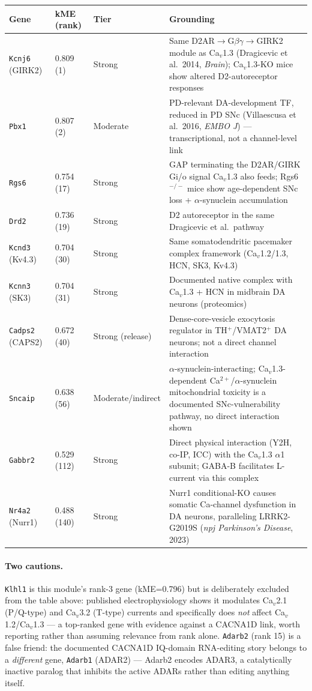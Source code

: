 \documentclass[11pt]{article}
\begin{document}
\begin{table}[h]
\centering
\begin{tabular}{llll}
\toprule
Gene & kME (rank) & Tier & Grounding \\
\midrule
\texttt{Kcnj6} (GIRK2) & 0.809 (1) & Strong & Same D2AR$\to$G$\beta\gamma\to$GIRK2 module as Ca$_v$1.3 (Dragicevic et al.\ 2014, \emph{Brain}); Ca$_v$1.3-KO mice show altered D2-autoreceptor responses \\
\texttt{Pbx1} & 0.807 (2) & Moderate & PD-relevant DA-development TF, reduced in PD SNc (Villaescusa et al.\ 2016, \emph{EMBO J}) --- transcriptional, not a channel-level link \\
\texttt{Rgs6} & 0.754 (17) & Strong & GAP terminating the D2AR/GIRK Gi/o signal Ca$_v$1.3 also feeds; Rgs6$^{-/-}$ mice show age-dependent SNc loss + $\alpha$-synuclein accumulation \\
\texttt{Drd2} & 0.736 (19) & Strong & D2 autoreceptor in the same Dragicevic et al.\ pathway \\
\texttt{Kcnd3} (Kv4.3) & 0.704 (30) & Strong & Same somatodendritic pacemaker complex framework (Ca$_v$1.2/1.3, HCN, SK3, Kv4.3) \\
\texttt{Kcnn3} (SK3) & 0.704 (31) & Strong & Documented native complex with Ca$_v$1.3 + HCN in midbrain DA neurons (proteomics) \\
\texttt{Cadps2} (CAPS2) & 0.672 (40) & Strong (release) & Dense-core-vesicle exocytosis regulator in TH$^+$/VMAT2$^+$ DA neurons; not a direct channel interaction \\
\texttt{Sncaip} & 0.638 (56) & Moderate/indirect & $\alpha$-synuclein-interacting; Ca$_v$1.3-dependent Ca$^{2+}$/$\alpha$-synuclein mitochondrial toxicity is a documented SNc-vulnerability pathway, no direct interaction shown \\
\texttt{Gabbr2} & 0.529 (112) & Strong & Direct physical interaction (Y2H, co-IP, ICC) with the Ca$_v$1.3 $\alpha$1 subunit; GABA-B facilitates L-current via this complex \\
\texttt{Nr4a2} (Nurr1) & 0.488 (140) & Strong & Nurr1 conditional-KO causes somatic Ca-channel dysfunction in DA neurons, paralleling LRRK2-G2019S (\emph{npj Parkinson's Disease}, 2023) \\
\bottomrule
\end{tabular}
\end{table}

\paragraph{Two cautions.} \texttt{Klhl1} is this module's rank-3 gene
(kME=0.796) but is deliberately excluded from the table above: published
electrophysiology shows it modulates Ca$_v$2.1 (P/Q-type) and Ca$_v$3.2
(T-type) currents and specifically does \emph{not} affect Ca$_v$1.2/Ca$_v$1.3
--- a top-ranked gene with evidence against a CACNA1D link, worth reporting
rather than assuming relevance from rank alone. \texttt{Adarb2} (rank 15) is
a false friend: the documented CACNA1D IQ-domain RNA-editing story belongs to
a \emph{different} gene, \texttt{Adarb1} (ADAR2) --- Adarb2 encodes ADAR3, a
catalytically inactive paralog that inhibits the active ADARs rather than
editing anything itself.
\end{document}
